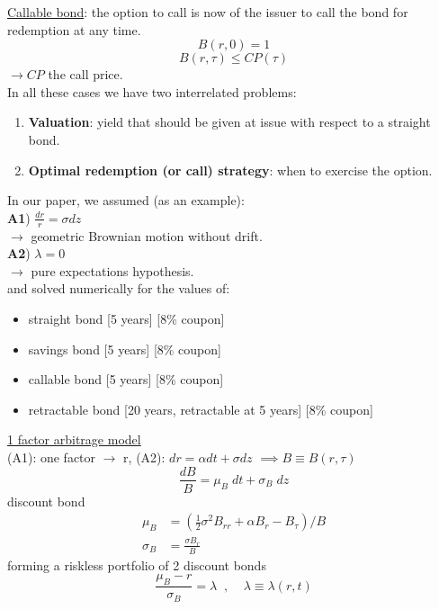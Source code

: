 \documentclass[
14pt,notheorems,hyperref={pdfauthor=whatever}
]{beamer}
\begin{document}
\begin{frame}
\underline{Callable bond}: the option to call is now of the issuer to call the bond for redemption at any time.\\
\[ B(r,0) = 1 \]
\[ B(r,\tau) \leq CP(\tau) \]
$\longrightarrow CP$ the call price.\\
\hfill\break
In all these cases we have two interrelated problems:\\
\begin{enumerate}
    \item \textbf{Valuation}: yield that should be given at issue with respect to a straight bond.
    \item \textbf{Optimal redemption (or call) strategy}: when to exercise the option.
\end{enumerate}
\end{frame}

\begin{frame}
In our paper, we assumed (as an example):\\
\hfill\break
\textbf{A1}) $\frac{dr}{r} = \sigma dz$\\
$\longrightarrow$ geometric Brownian motion without drift.\\
\hfill\break
\textbf{A2}) $\lambda = 0$\\
$\longrightarrow$ pure expectations hypothesis.\\
\hfill\break
and solved numerically for the values of:
\begin{itemize}
    \item straight bond [5 years] [8\% coupon]
    \item savings bond [5 years] [8\% coupon]
    \item callable bond [5 years] [8\% coupon]
    \item retractable bond [20 years, retractable at 5 years] [8\% coupon]
\end{itemize}
\end{frame}

\begin{frame}
\underline{1 factor arbitrage model}\\
\hfill\break
(A1): one factor $\longrightarrow$ r, \hfill (A2): $dr = \alpha dt + \sigma dz$ \hfill $\implies B \equiv B(r,\tau)\;\;\;\;\;\;\;\;$\\
\[ \frac{dB}{B} = \mu_B\;dt + \sigma_B\;dz \]
discount bond
\begin{align*}
    \mu_B &= (\frac{1}{2}\sigma^2B_{rr} + \alpha B_r - B_\tau) / B\\
    \sigma_B &= \frac{\sigma B_r}{B}
\end{align*}
forming a riskless portfolio of 2 discount bonds\\
\[ \frac{\mu_B-r}{\sigma_B} = \lambda \;\;, \;\;\;\; \lambda\equiv\lambda(r,t)\]
\end{frame}
\end{document}
